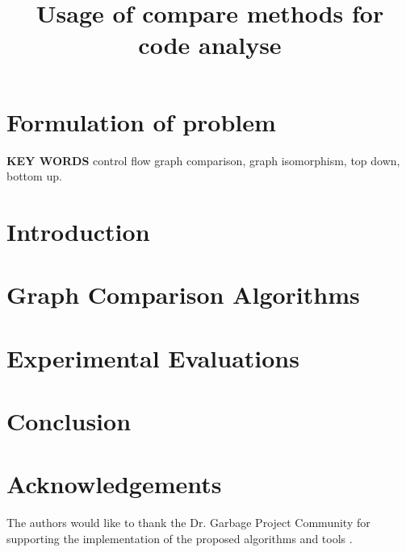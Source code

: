 \documentclass[twocolumn,letterpaper,10pt]{article}
\begin{document}
\date{}

\title{Usage of compare methods for code analyse }

%



\maketitle
\thispagestyle{empty}

\section{Formulation of problem}


%   
   
\noindent
{\bf\normalsize KEY WORDS}\newline
{control flow graph comparison, graph isomorphism, top down, bottom up.}

\section{Introduction}



%

\section{Graph Comparison Algorithms}


\section{\label{experimental_results}Experimental Evaluations}


\section{Conclusion} 


\section{Acknowledgements} 
The authors would like to thank the Dr. Garbage Project Community for supporting the implementation of the proposed algorithms and tools \cite{drgarbage_project}.


\end{document}
